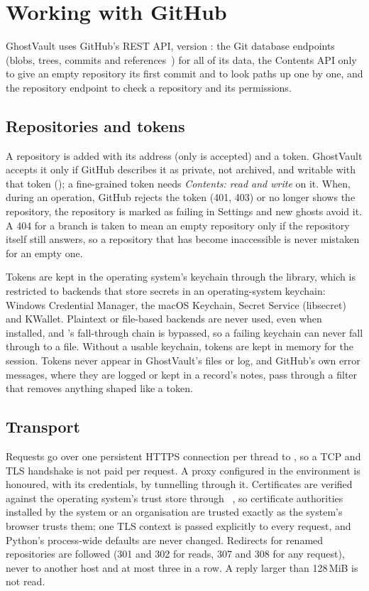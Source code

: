\section{Working with GitHub}\label{sec:github}

GhostVault uses GitHub's REST API, version : the Git database endpoints (blobs,
trees, commits and references~\cite{gh-git}) for all of its data, the Contents API only to give an
empty repository its first commit and to look paths up one by one, and the repository endpoint to
check a repository and its permissions.

\subsection{Repositories and tokens}\label{sec:gh-checks}
A repository is added with its address (only  is accepted) and a token. GhostVault
accepts it only if GitHub describes it as private, not archived, and writable with that token
(); a fine-grained token needs \emph{Contents: read and write} on it. When,
during an operation, GitHub rejects the token (401, 403) or no longer shows the repository, the
repository is marked as failing in Settings and new ghosts avoid it. A 404 for a branch is taken to
mean an empty repository only if the repository itself still answers, so a repository that has
become inaccessible is never mistaken for an empty one.

Tokens are kept in the operating system's keychain through the  library, which is
restricted to backends that store secrets in an operating-system keychain: Windows Credential
Manager, the macOS Keychain, Secret Service (libsecret) and KWallet. Plaintext or file-based backends
are never used, even when installed, and 's fall-through chain is bypassed, so a
failing keychain can never fall through to a file. Without a usable keychain, tokens are kept in
memory for the session. Tokens never appear in GhostVault's files or log, and GitHub's own error
messages, where they are logged or kept in a record's notes, pass through a filter that removes
anything shaped like a token.

\subsection{Transport}
Requests go over one persistent HTTPS connection per thread to , so a TCP and
TLS handshake is not paid per request. A proxy configured in the environment is honoured, with its
credentials, by tunnelling through it. Certificates are verified against the operating system's
trust store through ~\cite{truststore}, so certificate authorities installed by the
system or an organisation are trusted exactly as the system's browser trusts them; one TLS context is
passed explicitly to every request, and Python's process-wide defaults are never changed. Redirects
for renamed repositories are followed (301 and 302 for reads, 307 and 308 for any request), never to
another host and at most three in a row. A reply larger than 128\,MiB is not read.


